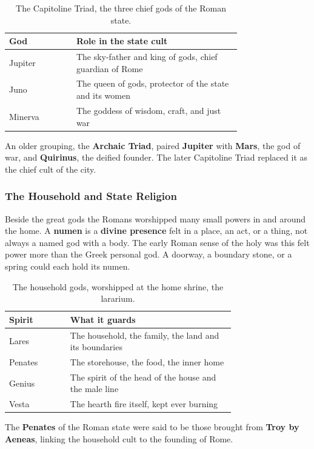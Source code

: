\begin{longtable}{L{0.22\linewidth} L{0.54\linewidth}}
\caption{The Capitoline Triad, the three chief gods of the Roman state.}\\
\toprule
\textbf{God} & \textbf{Role in the state cult} \\
\midrule
Jupiter & The sky-father and king of gods, chief guardian of Rome \\
Juno & The queen of gods, protector of the state and its women \\
Minerva & The goddess of wisdom, craft, and just war \\
\bottomrule
\end{longtable}

An older grouping, the \textbf{Archaic Triad}, paired \textbf{Jupiter} with
\textbf{Mars}, the god of war, and \textbf{Quirinus}, the deified founder. The
later Capitoline Triad replaced it as the chief cult of the city.

\subsubsection{The Household and State Religion}

Beside the great gods the Romans worshipped many small powers in and around
the home. A \textbf{numen} is a \textbf{divine presence} felt in a place, an act,
or a thing, not always a named god with a body. The early Roman sense of the holy
was this felt power more than the Greek personal god. A doorway, a boundary stone,
or a spring could each hold its numen.

\begin{longtable}{L{0.20\linewidth} L{0.54\linewidth}}
\caption{The household gods, worshipped at the home shrine, the lararium.}\\
\toprule
\textbf{Spirit} & \textbf{What it guards} \\
\midrule
Lares & The household, the family, the land and its boundaries \\
Penates & The storehouse, the food, the inner home \\
Genius & The spirit of the head of the house and the male line \\
Vesta & The hearth fire itself, kept ever burning \\
\bottomrule
\end{longtable}

The \textbf{Penates} of the Roman state were said to be those brought from
\textbf{Troy by Aeneas}, linking the household cult to the founding of Rome.

